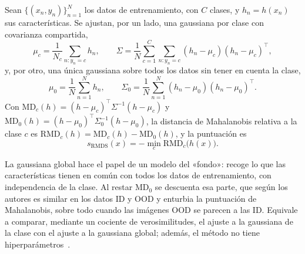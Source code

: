 \begin{definicion}\label{def:rmds}
Sean $\{(x_n, y_n)\}_{n=1}^{N}$ los datos de entrenamiento, con $C$ clases, y $h_n = h(x_n)$ sus características. Se ajustan, por un lado, una gaussiana por clase con covarianza compartida,
\[
  \mu_c = \frac{1}{N_c} \sum_{n : y_n = c} h_n, \qquad
  \Sigma = \frac{1}{N} \sum_{c=1}^{C} \sum_{n : y_n = c} (h_n - \mu_c)(h_n - \mu_c)^{\top},
\]
y, por otro, una única gaussiana sobre todos los datos sin tener en cuenta la clase,
\[
  \mu_0 = \frac{1}{N} \sum_{n=1}^{N} h_n, \qquad
  \Sigma_0 = \frac{1}{N} \sum_{n=1}^{N} (h_n - \mu_0)(h_n - \mu_0)^{\top}.
\]
Con $\mathrm{MD}_c(h) = (h - \mu_c)^{\top} \Sigma^{-1} (h - \mu_c)$ y $\mathrm{MD}_0(h) = (h - \mu_0)^{\top} \Sigma_0^{-1} (h - \mu_0)$, la distancia de Mahalanobis relativa a la clase $c$ es $\mathrm{RMD}_c(h) = \mathrm{MD}_c(h) - \mathrm{MD}_0(h)$, y la puntuación es~\cite[sec.~2]{ren2021}
\[
  s_{\mathrm{RMDS}}(x) = -\min_{c} \mathrm{RMD}_c\bigl(h(x)\bigr).
\]
\end{definicion}

La gaussiana global hace el papel de un modelo del «fondo»: recoge lo que las características tienen en común con todos los datos de entrenamiento, con independencia de la clase. Al restar $\mathrm{MD}_0$ se descuenta esa parte, que según los autores es similar en los datos ID y OOD y enturbia la puntuación de Mahalanobis, sobre todo cuando las imágenes OOD se parecen a las ID. Equivale a comparar, mediante un cociente de verosimilitudes, el ajuste a la gaussiana de la clase con el ajuste a la gaussiana global; además, el método no tiene hiperparámetros~\cite[sec.~2]{ren2021}.

